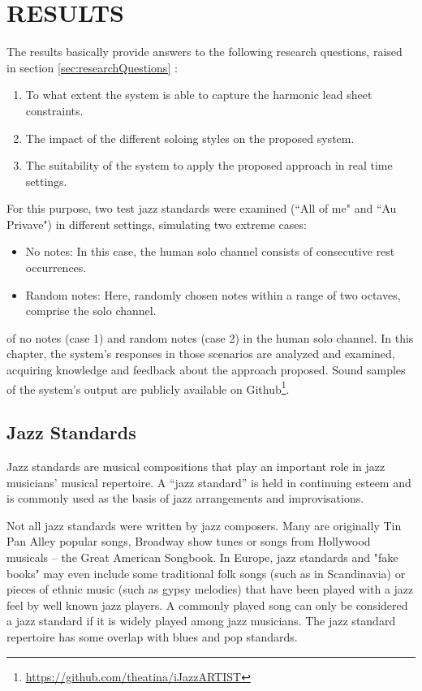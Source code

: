 \chapter{RESULTS} \label{chapter:results}
The results basically provide answers to the following research questions, raised in section \ref{sec:researchQuestions} :
    \begin{enumerate}
        \item To what extent the system is able to capture the harmonic lead sheet constraints.
        \item The impact of the different soloing styles on the proposed system.
        \item The suitability of the system to apply the proposed approach in real time settings.
    \end{enumerate}

For this purpose, two test jazz standards were examined (``All of me" and ``Au Privave") in different settings, simulating two extreme cases: 
    \begin{itemize}
        \item No notes: In this case, the human solo channel consists of consecutive rest occurrences. 
        \item Random notes: Here, randomly chosen notes within a range of two octaves, comprise the solo channel.
    \end{itemize} of no notes (case 1) and random notes (case 2) in the human solo channel. In this chapter, the system's responses in those scenarios are analyzed and examined, acquiring knowledge and feedback about the approach proposed. Sound samples of the system's output are publicly available on Github\footnote{\url{https://github.com/theatina/iJazzARTIST}}.
    
    \section{Jazz Standards} \label{sec:jazzStandards}
    Jazz standards are musical compositions that play an important role in jazz musicians' musical repertoire. A ``jazz standard” is held in continuing esteem and is commonly used as the basis of jazz arrangements and improvisations. 
    
    Not all jazz standards were written by jazz composers. Many are originally Tin Pan Alley popular songs, Broadway show tunes or songs from Hollywood musicals – the Great American Songbook. In Europe, jazz standards and "fake books" may even include some traditional folk songs (such as in Scandinavia) or pieces of ethnic music (such as gypsy melodies) that have been played with a jazz feel by well known jazz players. A commonly played song can only be considered a jazz standard if it is widely played among jazz musicians. The jazz standard repertoire has some overlap with blues and pop standards.
    
